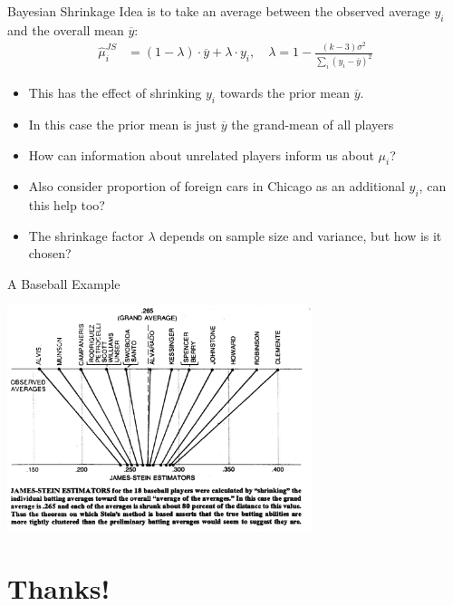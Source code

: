 \documentclass[xcolor=pdftex,dvipsnames,table,mathserif,aspectratio=169]{beamer}
\begin{document}
\begin{frame}[fragile]{Bayesian Shrinkage}
Idea is to take an average between the observed average $y_i$ and the overall mean $\overline{y}$:
\begin{align*}
\widehat{\mu}_i^{JS} &=  (1-\lambda) \cdot \overline{y}  + \lambda \cdot y_i, \quad
\lambda = 1 - \frac{(k-3) \sigma^2}{\sum_i( y_i - \overline{y})^2}
\end{align*}
\begin{itemize}
\item This has the effect of \alert{shrinking} $y_i$ towards the \alert{prior mean} $\overline{y}$.
\item In this case the \alert{prior mean} is just $\overline{y}$ the grand-mean of all players
\item How can information about unrelated players inform us about $\mu_i$?
\item Also consider proportion of foreign cars in Chicago as an additional $y_i$, can this help too?
\item The \alert{shrinkage factor} $\lambda$ depends on sample size and variance, but how is it chosen?
\end{itemize}
\end{frame}



\begin{frame}[fragile]{A Baseball Example}
\begin{center}
\includegraphics[width=3.5in]{./resources/baseball2.png}
\end{center}
\end{frame}

\section*{Thanks!}
\end{document}
